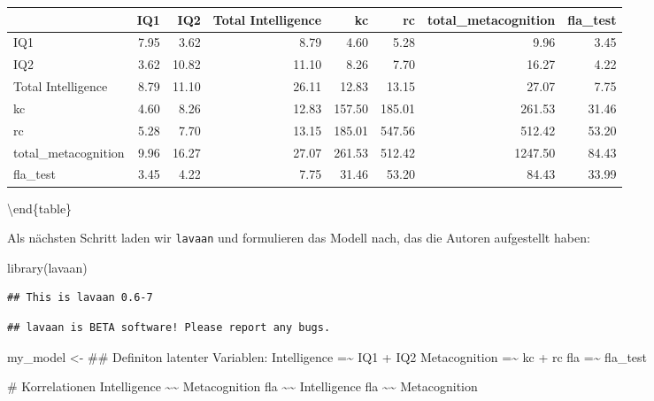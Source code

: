 \documentclass[
]{book}
\newenvironment{Shaded}{\begin{snugshade}}{\end{snugshade}}
\newcommand{\FunctionTok}[1]{\textcolor[rgb]{0.00,0.00,0.00}{#1}}
\newcommand{\NormalTok}[1]{#1}
\newcommand{\OtherTok}[1]{\textcolor[rgb]{0.56,0.35,0.01}{#1}}
\newcommand{\StringTok}[1]{\textcolor[rgb]{0.31,0.60,0.02}{#1}}
\begin{document}
\begin{tabular}[t]{lrrrrrrr}
\toprule
  & IQ1 & IQ2 & Total Intelligence & kc & rc & total\_metacognition & fla\_test\\
\midrule
IQ1 & 7.95 & 3.62 & 8.79 & 4.60 & 5.28 & 9.96 & 3.45\\
IQ2 & 3.62 & 10.82 & 11.10 & 8.26 & 7.70 & 16.27 & 4.22\\
Total Intelligence & 8.79 & 11.10 & 26.11 & 12.83 & 13.15 & 27.07 & 7.75\\
kc & 4.60 & 8.26 & 12.83 & 157.50 & 185.01 & 261.53 & 31.46\\
rc & 5.28 & 7.70 & 13.15 & 185.01 & 547.56 & 512.42 & 53.20\\
\addlinespace
total\_metacognition & 9.96 & 16.27 & 27.07 & 261.53 & 512.42 & 1247.50 & 84.43\\
fla\_test & 3.45 & 4.22 & 7.75 & 31.46 & 53.20 & 84.43 & 33.99\\
\bottomrule
\end{tabular}

\textbackslash end\{table\}

Als nächsten Schritt laden wir \texttt{lavaan} und formulieren das Modell nach, das die Autoren aufgestellt haben:

\begin{Shaded}
\begin{Highlighting}[]
\FunctionTok{library}\NormalTok{(lavaan)}
\end{Highlighting}
\end{Shaded}

\begin{verbatim}
## This is lavaan 0.6-7
\end{verbatim}

\begin{verbatim}
## lavaan is BETA software! Please report any bugs.
\end{verbatim}

\begin{Shaded}
\begin{Highlighting}[]
\NormalTok{my\_model }\OtherTok{\textless{}{-}} \StringTok{\textquotesingle{}}
\StringTok{\#\# Definiton latenter Variablen:}
\StringTok{Intelligence =\textasciitilde{} IQ1 + IQ2}
\StringTok{Metacognition =\textasciitilde{} kc + rc}
\StringTok{fla =\textasciitilde{} fla\_test}

\StringTok{\# Korrelationen}
\StringTok{Intelligence \textasciitilde{}\textasciitilde{} Metacognition}
\StringTok{fla \textasciitilde{}\textasciitilde{} Intelligence }
\StringTok{fla \textasciitilde{}\textasciitilde{} Metacognition}
\StringTok{\textquotesingle{}}
\end{Highlighting}
\end{Shaded}
\end{document}
